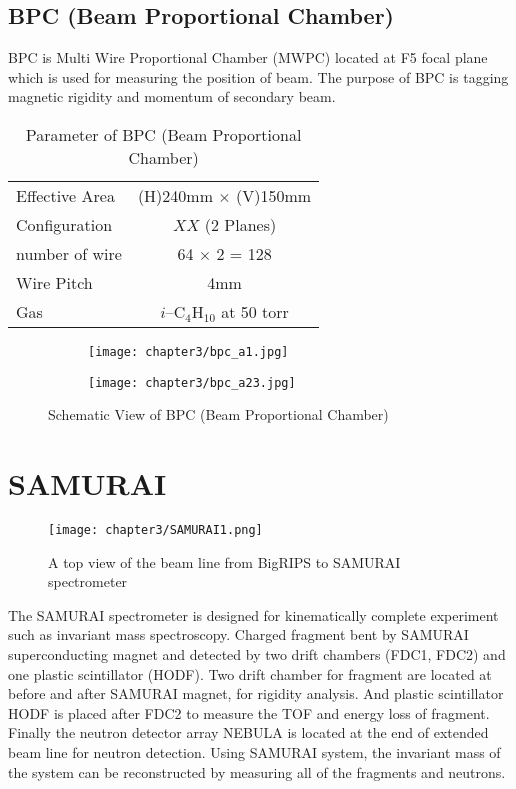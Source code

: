 \subsection{BPC (Beam Proportional Chamber)}
BPC is Multi Wire Proportional Chamber (MWPC) located at F5 focal plane which is used for measuring the position of beam. The purpose of BPC is tagging magnetic rigidity and momentum of secondary beam.
\begin{table}[h]
    \centering
    \begin{tabular}{l|c}
        \hline
        Effective Area & (H)240mm $\times$ (V)150mm \\
        Configuration & $XX$ (2 Planes) \\
        number of wire & 64 $\times$ 2 = 128 \\
        Wire Pitch & 4mm \\
        Gas & $i$--${\text{C}}_{4} {\text{H}}_{10}$ at 50 torr\\
        \hline
    \end{tabular}
    \caption{Parameter of BPC (Beam Proportional Chamber) \cite{SAMURAI}}
\end{table}


\begin{figure}[h]
    \centering
    \begin{subfigure}[h]{\textwidth}
        \centering
        \texttt{[image: chapter3/bpc\_a1.jpg]}
    \end{subfigure}
    \begin{subfigure}[h]{\textwidth}
        \hspace{2.4cm}
        \texttt{[image: chapter3/bpc\_a23.jpg]}
    \end{subfigure}
        \caption{Schematic View of BPC (Beam Proportional Chamber) \cite{SAMURAI}}
\end{figure}

\clearpage

\section{SAMURAI}

\begin{figure}[hbt!]
    \centering
    \texttt{[image: chapter3/SAMURAI1.png]}
    \caption{A top view of the beam line from BigRIPS to SAMURAI spectrometer}
\end{figure}

The SAMURAI spectrometer is designed for kinematically complete experiment such as invariant mass spectroscopy. \cite{SAMURAIConcept} Charged fragment bent by SAMURAI superconducting magnet and detected by two drift chambers (FDC1, FDC2) and one plastic scintillator (HODF). Two drift chamber for fragment are located at before and after SAMURAI magnet, for rigidity analysis. And plastic scintillator HODF is placed after FDC2 to measure the TOF and energy loss of fragment. Finally the neutron detector array NEBULA is located at the end of extended beam line for neutron detection. Using SAMURAI system, the invariant mass of the system can be reconstructed by measuring all of the fragments and neutrons.

